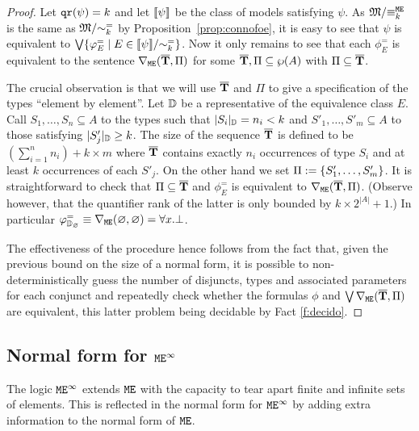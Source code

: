 \begin{proof}
Let $\mathtt{qr}(\psi) = k$ and let $\llbracket\psi\rrbracket$ be the class of models satisfying 
$\psi$.
As $\mathfrak{M}/{\equiv_k^{\mathtt{M}\mathtt{E}}}$ is the same as $\mathfrak{M}/{\sim_k^=}$ by
Proposition~\ref{prop:connofoe}, it is easy to see that $\psi$ is equivalent to 
$\bigvee \{ \varphi^=_E \mid E \in \llbracket\psi\rrbracket/{\sim_k^=} \}$.
Now it only remains to see that each $\phi^=_E$ is equivalent to the sentence
$\nabla_{\mathtt{M}\mathtt{E}}(\overline{{\mathbf{T}}},\Pi)$ for some $\overline{{\mathbf{T}}},\Pi \subseteq \wp(A)$ with
$\Pi \subseteq \overline{{\mathbf{T}}}$.

The crucial observation is that we will use $\overline{{\mathbf{T}}}$ and $\Pi$ to give a 
specification of the types ``element by element''. 
Let $\mathbb{D}$ be a representative of the equivalence class $E$. 
Call $S_1,\dots,S_n \subseteq A$ to the types such that $|S_i|_{\mathbb{D}} = n_i 
< k$ and $S'_1,\dots,S'_m \subseteq A$ to those satisfying $|S'_j|_{\mathbb{D}} 
\geq k$. 
The size of the sequence $\overline{{\mathbf{T}}}$ is defined to be $(\sum_{i=1}^n n_i) + 
k\times m$ where $\overline{{\mathbf{T}}}$ contains exactly $n_i$ occurrences of type $S_i$ 
and at least $k$ occurrences of each $S'_j$.
On the other hand we set $\Pi \mathrel{:=} \{S'_1,\dots,S'_m\}$. 
It is straightforward to check that $\Pi \subseteq \overline{{\mathbf{T}}}$ and $\phi^=_E$ is
equivalent to $\nabla_{\mathtt{M}\mathtt{E}}(\overline{{\mathbf{T}}},\Pi)$. (Observe however, that the quantifier rank of the latter is only bounded by
$k\times 2^{|A|} + 1$.) 
In particular $\varphi^=_{\mathbb{D}_\varnothing} \equiv \nabla_{\mathtt{M}\mathtt{E}}(\varnothing,\varnothing) = \forall x. \bot$.



The effectiveness of the procedure hence follows from the fact that, given the previous bound on the size of a normal form, it is possible to
non-deterministically guess the number of disjuncts, types and associated parameters for each conjunct and repeatedly check whether the formulas $\phi$
and    $\bigvee \nabla_{\mathtt{M}\mathtt{E}}(\overline{{\mathbf{T}}},\Pi)$ are equivalent,  this latter problem being decidable by Fact \ref{f:decido}.
\end{proof}



\subsection{Normal form for $\mathtt{M}\mathtt{E}^{\infty}$}

The logic $\mathtt{M}\mathtt{E}^{\infty}$ extends $\mathtt{M}\mathtt{E}$ with the capacity to tear apart finite and 
infinite sets of elements. 
This is reflected in the normal form for $\mathtt{M}\mathtt{E}^{\infty}$ by adding extra information
to the normal form of $\mathtt{M}\mathtt{E}$.

